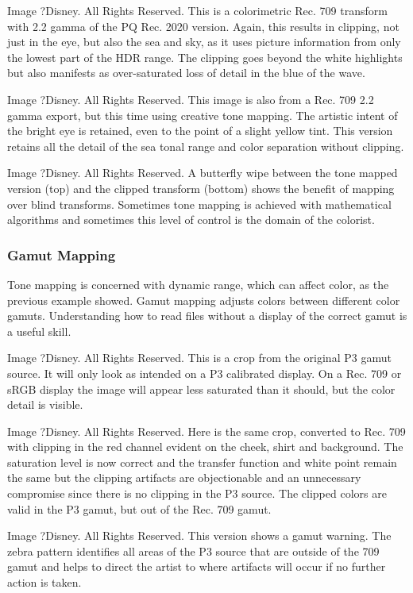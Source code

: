 Image ?Disney. All Rights Reserved.
This is a colorimetric Rec. 709 transform with 2.2 gamma of the PQ Rec. 2020 version. Again, this results in clipping, not just in the eye, but also the sea and sky, as it uses picture information from only the lowest part of the HDR range. The clipping goes beyond the white highlights but also manifests as over-saturated loss of detail in the blue of the wave.


Image ?Disney. All Rights Reserved.
This image is also from a Rec. 709 2.2 gamma export, but this time using creative tone mapping. The artistic intent of the bright eye is retained, even to the point of a slight yellow tint. This version retains all the detail of the sea tonal range and color separation without clipping.


Image ?Disney. All Rights Reserved.
A butterfly wipe between the tone mapped version (top) and the clipped transform (bottom) shows the benefit of mapping over blind transforms. Sometimes tone mapping is achieved with mathematical algorithms and sometimes this level of control is the domain of the colorist.

\subsubsection{Gamut Mapping}%
\label{subsubsec:gamut-mapping}

Tone mapping is concerned with dynamic range, which can affect color, as the previous example showed. Gamut mapping adjusts colors between different color gamuts. Understanding how to read files without a display of the correct gamut is a useful skill.

Image ?Disney. All Rights Reserved.
This is a crop from the original P3 gamut source. It will only look as intended on a P3 calibrated display. On a Rec. 709 or sRGB display the image will appear less saturated than it should, but the color detail is visible.


Image ?Disney. All Rights Reserved.
Here is the same crop, converted to Rec. 709 with clipping in the red channel evident on the cheek, shirt and background. The saturation level is now correct and the transfer function and white point remain the same but the clipping artifacts are objectionable and an unnecessary compromise since there is no clipping in the P3 source. The clipped colors are valid in the P3 gamut, but out of the Rec. 709 gamut.


Image ?Disney. All Rights Reserved.
This version shows a gamut warning. The zebra pattern identifies all areas of the P3 source that are outside of the 709 gamut and helps to direct the artist to where artifacts will occur if no further action is taken.


